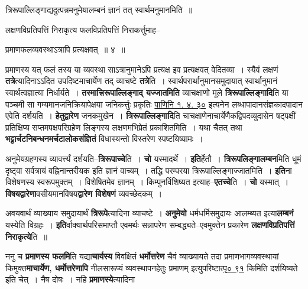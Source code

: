 \documentclass[article,12pt,a4paper]{memoir}
\begin{document}
	त्रिरूपाल्लिङ्गाद्यदुत्पन्नमनुमेयालम्बनं ज्ञानं तत् स्वार्थमनुमानमिति ॥  
	  
	लक्षणविप्रतिपत्तिं निराकृत्य फलविप्रतिपत्तिं निराकर्त्तुमाह--  
	  
	प्रमाणफलव्यवस्थाऽत्रापि प्रत्यक्षवत् ॥ ४ ॥ 
	  
	प्रमाणस्य यत् फलं तस्य या व्यवस्था साऽत्रानुमानेऽपि प्रत्यक्ष इव प्रत्यक्षवत् वेदितव्या । स्यैवं लक्षणं \textbf{तत्रे}त्यादिनाऽऽदित उपदिष्टमाचार्येण तद् व्याचष्टे \textbf{तत्रे}ति । स्वार्थपरार्थानुमानसमुदायात् स्वार्थानुमानं स्वार्थत्वज्ञात्या निर्धार्यते । \textbf{तस्मात्त्रिरूपाल्लिङ्गाद् यज्जातमिति} व्याचक्षाणो मूले \textbf{त्रिरूपाल्लिङ्गादि}ति या पञ्चमी सा गम्यमानजनिक्रियापेक्षया जनिकर्त्तुः प्रकृतिः \href{http://sarit.indology.info/?cref=Pā.1.4.30}{पाणिनि १. ४. ३०} इत्यनेन लब्धापादानसंज्ञकादपादान एवेति दर्शयति । \textbf{हेतुद्वारेण} जनकमुखेन । \textbf{त्रिरूपाल्लिङ्गादि}ति चाचक्षाणेनाचार्येणैकद्विपदव्युदासेन षट्पक्षीं प्रतिक्षिप्य सप्तमपक्षपरिग्रहेण लिङ्गस्य लक्षणमभिप्रेतं प्रकाशितमिति । यथा चैतत् तथा \textbf{भट्टार्चटनिबन्धनमर्चटालोकसंज्ञितं} विधास्यन्तो विस्तरेण स्पष्टयिष्यामः ।
	\pend
      

	  \pstart अनुमेयग्रहणस्य व्यावर्त्त्यं दर्शयति--\textbf{त्रिरूपाच्चे}ति । \textbf{चो} यस्मादर्थे । \textbf{इति}र्हेतौ । \textbf{त्रिरूपलिङ्गालम्बन}मिति धूमं दृष्ट्वा सर्वत्रायं वह्निनान्तरीयक इति ज्ञानं वाच्यम् । तद्धि परम्परया त्रिरूपाल्लिङ्गाज्जातमिति । \textbf{इति}ना विशेषणस्य स्वरूपमुक्तम् । विशेषितमेव ज्ञानम् । किम्पुनर्विशिष्यत इत्याह--\textbf{एतच्चे}ति । \textbf{चो} यस्मात् । \textbf{विषयद्वारेणा}वसीयमानविषय\textbf{द्वारेण विशेषणं} व्यवच्छेदकम् ।
	\pend
      

	  \pstart अवयवार्थं व्याख्याय समुदायार्थं \textbf{त्रिरूपे}त्यादिना व्याचष्टे । \textbf{अनुमेयो} धर्मधर्मिसमुदायः आलम्ब्यत इत्या\textbf{लम्बनं} यस्येति विग्रहः । \textbf{इति}र्वाक्यार्थपरिसमाप्तौ एवमर्थः सन्नापरेण सम्बद्ध्यते--एवमुक्तेन प्रकारेण \textbf{लक्षणविप्रतिपत्तिं निराकृत्ये}ति ॥
	\pend
      

	  \pstart ननु च \textbf{प्रमाणस्य फलमि}ति यद्या\textbf{चार्यस्य} विवक्षितं \textbf{धर्मोत्तरेण} चैवं व्याख्यायते तदा प्रमाणभागव्यवस्थायां किमुक्त\textbf{माचार्येण, धर्मोत्तरेणापि} नीलसारूप्यं व्यवस्थापनहेतुः प्रमाणम् इत्युपरिष्टात्\href{http://sarit.indology.info/?cref=p91}{पृ० ९१} किमिति दर्शयिष्यते इति चेत् । नैष दोषः । नहि \textbf{प्रमाणस्ये}त्यादिना  \leavevmode{} 
	  
\end{document}
